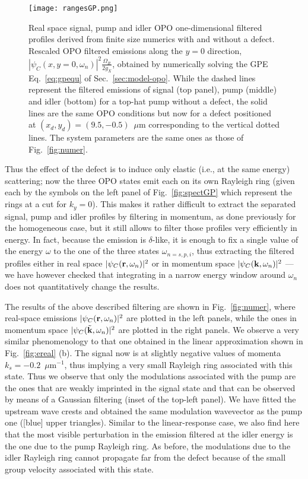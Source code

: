 \begin{figure}[tb]\centering
\texttt{[image: rangesGP.png]}
\caption{Real space signal, pump and idler OPO one-dimensional
  filtered profiles derived from finite size numerics with and without
  a defect. Rescaled OPO filtered emissions along the $y=0$ direction,
  $|\psi_C(x,y=0,\omega_n)|^2 \frac{\Omega_R}{2g_X}$, obtained by
  numerically solving the GPE Eq.~\eqref{eq:gpequ} of
  Sec.~\ref{sec:model-opo}. While the dashed lines represent the
  filtered emissions of signal (top panel), pump (middle) and idler
  (bottom) for a top-hat pump without a defect, the solid lines are
  the same OPO conditions but now for a defect positioned at
  $(x_d, y_d) = (9.5, -0.5)$~$\mu$m corresponding to the vertical
  dotted lines. The system parameters are the same ones as those of
  Fig.~\ref{fig:numer}.}
\label{fig:rafull}
\end{figure}
%
Thus the effect of the defect is to induce only elastic (i.e., at the
same energy) scattering; now the three OPO states emit each on its own
Rayleigh ring (given each by the symbols on the left panel of
Fig.~\ref{fig:spectGP} which represent the rings at a cut for
$k_y=0$). This makes it rather difficult to extract the separated
signal, pump and idler profiles by filtering in momentum, as done
previously for the homogeneous case, but it still allows to filter
those profiles very efficiently in energy. In fact, because the
emission is $\delta$-like, it is enough to fix a single value of the
energy $\omega$ to the one of the three states $\omega_{n=s,p,i}$,
thus extracting the filtered profiles either in real space
$|\psi_C(\mathbf{r},\omega_n)|^2$ or in momentum space
$|\psi_C(\mathbf{k},\omega_n)|^2$ --- we have however checked that
integrating in a narrow energy window around $\omega_n$ does not
quantitatively change the results.

The results of the above described filtering are shown in
Fig.~\ref{fig:numer}, where real-space emissions
$|\psi_C (\mathbf{r},\omega_n)|^2$ are plotted in the left panels, while
the ones in momentum space $|\psi_C (\tilde{\mathbf{k}},\omega_n)|^2$ are
plotted in the right panels. We observe a very similar phenomenology
to that one obtained in the linear approximation shown in
Fig.~\ref{fig:ereal} (b). The signal now is at slightly negative
values of momenta $k_s=-0.2$~$\mu$m$^{-1}$, thus implying a very small
Rayleigh ring associated with this state. Thus we observe that only
the modulations associated with the pump are the ones that are weakly
imprinted in the signal state and that can be observed by means of a
Gaussian filtering (inset of the top-left panel). We have fitted the
upstream wave crests and obtained the same modulation wavevector as
the pump one ([blue] upper triangles). Similar to the linear-response
case, we also find here that the most visible perturbation in the
emission filtered at the idler energy is the one due to the pump
Rayleigh ring. As before, the modulations due to the idler Rayleigh
ring cannot propagate far from the defect because of the small group
velocity associated with this state.

